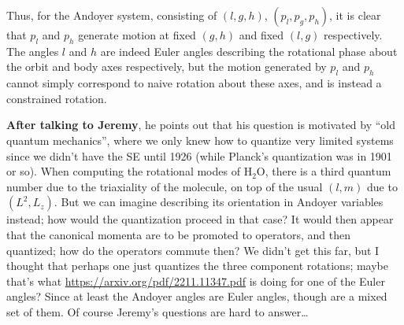 \documentclass[12pt]{article}
\begin{document}
Thus, for the Andoyer system, consisting of $(l, g, h)$, $(p_l, p_g, p_h)$, it
is clear that $p_l$ and $p_h$ generate motion at fixed $(g, h)$ and fixed $(l,
g)$ respectively. The angles $l$ and $h$ are indeed Euler angles describing the
rotational phase about the orbit and body axes respectively, but the motion
generated by $p_l$ and $p_h$ cannot simply correspond to naive rotation about
these axes, and is instead a constrained rotation.

\textbf{After talking to Jeremy}, he points out that his question is motivated
by ``old quantum mechanics'', where we only knew how to quantize very limited
systems since we didn't have the SE until 1926 (while Planck's quantization was
in 1901 or so). When computing the rotational modes of H$_2$O, there is a third
quantum number due to the triaxiality of the molecule, on top of the usual $(l,
m)$ due to $(L^2, L_z)$. But we can imagine describing its orientation in
Andoyer variables instead; how would the quantization proceed in that case? It
would then appear that the canonical momenta are to be promoted to operators,
and then quantized; how do the operators commute then? We didn't get this far,
but I thought that perhaps one just quantizes the three component rotations;
maybe that's what \url{https://arxiv.org/pdf/2211.11347.pdf} is doing for one of
the Euler angles? Since at least the Andoyer angles are Euler angles, though are
a mixed set of them. Of course Jeremy's questions are hard to answer\dots
\end{document}
